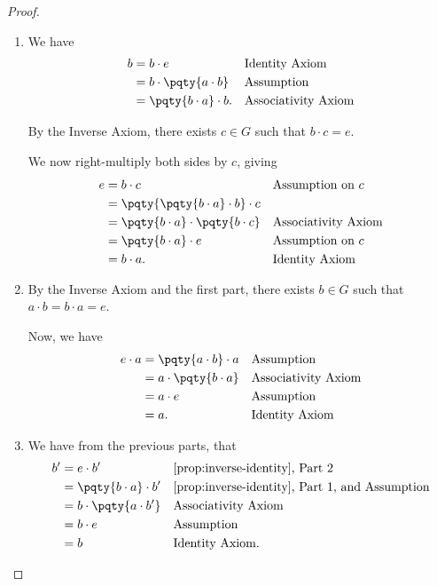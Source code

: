\begin{proof}
    \begin{enumerate}
        \item We have
        \begin{align*}
            b &= b \cdot e && \text{Identity Axiom} \\
            &= b \cdot \pqty{a \cdot b} && \text{Assumption} \\
            &= \pqty{b \cdot a} \cdot b. && \text{Associativity Axiom}
        \end{align*}

        By the Inverse Axiom, there exists \(c \in G\) such that \(b \cdot c = e\).

        We now right-multiply both sides by \(c\), giving
        \begin{align*}
            e &= b \cdot c && \text{Assumption on }c \\
            &= \pqty{\pqty{b \cdot a} \cdot b} \cdot c \\
            &= \pqty{b \cdot a} \cdot \pqty{b \cdot c} && \text{Associativity Axiom} \\
            &= \pqty{b \cdot a} \cdot e && \text{Assumption on }c \\
            &= b \cdot a. && \text{Identity Axiom}
        \end{align*}

        \item By the Inverse Axiom and the first part, there exists \(b \in G\) such that \(a \cdot b = b \cdot a = e\).
        
        Now, we have
        \begin{align*}
            e \cdot a &= \pqty{a \cdot b} \cdot a && \text{Assumption} \\
            &= a \cdot \pqty{b \cdot a} && \text{Associativity Axiom} \\
            &= a \cdot e && \text{Assumption} \\
            &= a. && \text{Identity Axiom}
        \end{align*}

        \item We have from the previous parts, that
        \begin{align*}
            b' &= e \cdot b' && \text{\autoref{prop:inverse-identity}, Part 2} \\
            &= \pqty{b \cdot a} \cdot b' && \text{\autoref{prop:inverse-identity}, Part 1, and Assumption} \\
            &= b \cdot \pqty{a \cdot b'} && \text{Associativity Axiom} \\
            &= b \cdot e && \text{Assumption} \\
            &= b && \text{Identity Axiom}.
        \end{align*}


\end{enumerate}
\end{proof}
